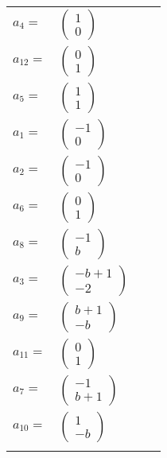 \documentclass[1p]{elsarticle_modified}
\theoremstyle{definition}
\begin{document}
\begin{tabular}{m{7pt} m{180pt} m{7pt} m{180pt} }
\flushright $a_{4}=$&$\begin{pmatrix}1\\0\end{pmatrix}$ \\
\flushright $a_{12}=$&$\begin{pmatrix}0\\1\end{pmatrix}$ \\
\flushright $a_{5}=$&$\begin{pmatrix}1\\1\end{pmatrix}$ \\
\flushright $a_{1}=$&$\begin{pmatrix}-1\\0\end{pmatrix}$ \\
\flushright $a_{2}=$&$\begin{pmatrix}-1\\0\end{pmatrix}$ \\
\flushright $a_{6}=$&$\begin{pmatrix}0\\1\end{pmatrix}$ \\
\flushright $a_{8}=$&$\begin{pmatrix}-1\\b\end{pmatrix}$ \\
\flushright $a_{3}=$&$\begin{pmatrix}- b+1\\-2\end{pmatrix}$ \\
\flushright $a_{9}=$&$\begin{pmatrix}b+1\\- b\end{pmatrix}$ \\
\flushright $a_{11}=$&$\begin{pmatrix}0\\1\end{pmatrix}$ \\
\flushright $a_{7}=$&$\begin{pmatrix}-1\\b+1\end{pmatrix}$ \\
\flushright $a_{10}=$&$\begin{pmatrix}1\\- b\end{pmatrix}$\\&\end{tabular}
\end{document}
